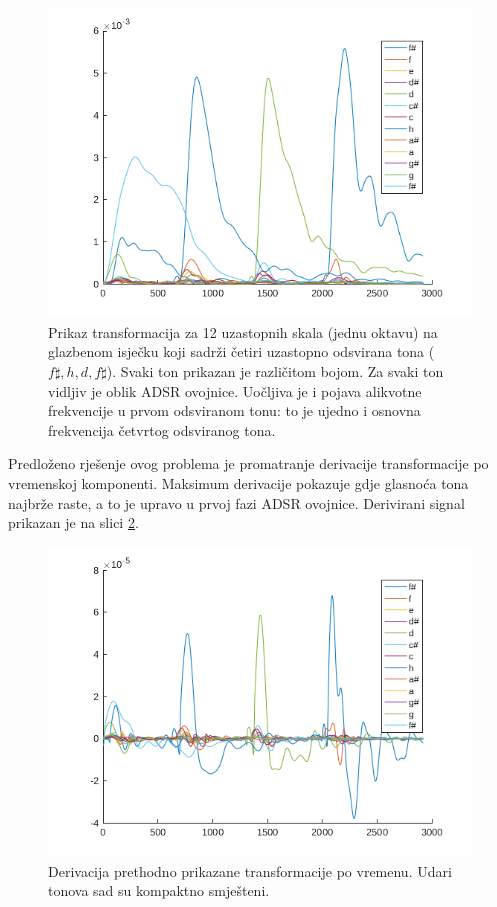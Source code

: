 \documentclass[a4paper, 11pt, twocolumn]{article}
\begin{document}
\begin{figure}[htb]
  \includegraphics[width=\linewidth]{adsr_anomalija}
  \caption{Prikaz transformacija za 12 uzastopnih skala (jednu oktavu) na glazbenom isječku koji sadrži četiri uzastopno odsvirana tona ($f\sharp, h, d, f\sharp$). Svaki ton prikazan je različitom bojom. Za svaki ton vidljiv je oblik ADSR ovojnice. Uočljiva je i pojava alikvotne frekvencije u prvom odsviranom tonu: to je ujedno i osnovna frekvencija četvrtog odsviranog tona.}
  \label{fig:adsr_anomalija}
\end{figure}

Predloženo rješenje ovog problema je promatranje derivacije transformacije po vremenskoj komponenti.
Maksimum derivacije pokazuje gdje glasnoća tona najbrže raste, a to je upravo u prvoj fazi ADSR ovojnice.
Derivirani signal prikazan je na slici \ref{fig:adsr_der}.

\begin{figure}[htb]
  \includegraphics[width=\linewidth]{adsr_der}
  \caption{Derivacija prethodno prikazane transformacije po vremenu. Udari tonova sad su kompaktno smješteni.}
  \label{fig:adsr_der}
\end{figure}
\end{document}
